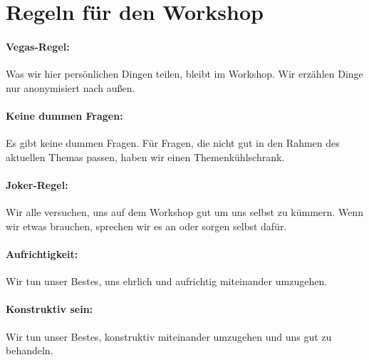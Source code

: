 \section{Regeln für den Workshop}

\paragraph{Vegas-Regel:} Was wir hier persönlichen Dingen teilen, bleibt im Workshop. Wir erzählen Dinge nur anonymisiert nach außen.

\paragraph{Keine dummen Fragen:} Es gibt keine dummen Fragen. Für Fragen, die nicht gut in den Rahmen des aktuellen Themas passen, haben wir einen Themenkühlschrank.

\paragraph{Joker-Regel:} Wir alle versuchen, uns auf dem Workshop gut um uns selbst zu kümmern. Wenn wir etwas brauchen, sprechen wir es an oder sorgen selbst dafür.

\paragraph{Aufrichtigkeit:} Wir tun unser Bestes, uns ehrlich und aufrichtig miteinander umzugehen.

\paragraph{Konstruktiv sein:} Wir tun unser Bestes, konstruktiv miteinander umzugehen und uns gut zu behandeln.
